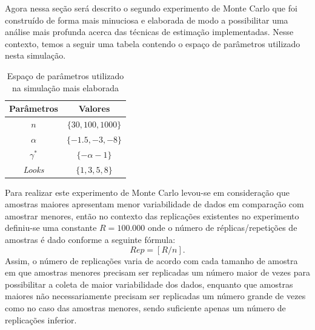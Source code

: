 Agora nessa seção será descrito o segundo experimento de Monte Carlo que foi construído de forma mais minuciosa e elaborada de modo a possibilitar uma análise mais profunda acerca das técnicas de estimação implementadas. 
Nesse contexto, temos a seguir uma tabela contendo o espaço de parâmetros utilizado nesta simulação.

\begin{table}[H]
\centering
\caption{Espaço de parâmetros utilizado na simulação mais elaborada}
\smallskip
{}
\label{tab:tabela_parameters_2}
\begin{tabular}{c|c}
\toprule 
\multicolumn{1}{c|}{Parâmetros} & \multicolumn{1}{c}{Valores}  \\ 
\midrule
\rowcolor[gray]{.9} 
$n$ & $\{30, 100, 1000\}$ \\ \hline
$\alpha$ & $\{-1.5, -3, -8\}$ \\ \hline
\rowcolor[gray]{.9} $\gamma^*$ & $\{-\alpha - 1\}$ \\ \hline
\textit{Looks} & $\{1, 3, 5, 8\}$ \\ 
\bottomrule
\end{tabular}
\end{table}

Para realizar este experimento de Monte Carlo levou-se em consideração que amostras maiores apresentam menor variabilidade de dados em comparação com amostrar menores, então no contexto das replicações existentes no experimento definiu-se uma constante $R = 100.000$ onde o número de réplicas/repetições de amostras é dado conforme a seguinte fórmula:
\begin{equation}
    Rep = [R/n]. \label{eq:rep}
\end{equation}
Assim, o número de replicações varia de acordo com cada tamanho de amostra em que amostras menores precisam ser replicadas um número maior de vezes para possibilitar a coleta de maior variabilidade dos dados, enquanto que amostras maiores não necessariamente precisam ser replicadas um número grande de vezes como no caso das amostras menores, sendo suficiente apenas um número de replicações inferior. 

